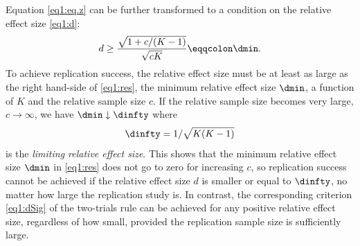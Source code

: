 Equation \eqref{eq1:eq.z} can be further transformed to a
condition on the relative effect size \eqref{eq1:d}:
\begin{equation}\label{eq1:res}
  d \geq  \frac{\sqrt{1+c/(K-1)}}{ \sqrt{c K}} \eqqcolon \dmin .
\end{equation}
To achieve replication success, the relative effect size must be at least as
large as the right hand-side of \eqref{eq1:res}, the minimum relative effect size
$\dmin$, a function of $K$ and the relative sample size $c$. If the relative
sample size becomes very large, \ie{} $c \rightarrow \infty$, we have
$\dmin \downarrow \dinfty$ where
\begin{equation}\label{eq1:smallestpossible}
  \dinfty = 1/\sqrt{K (K-1)}
\end{equation}
is the \textit{limiting relative effect size}. This shows that the minimum
relative effect size $\dmin$ in \eqref{eq1:res} does not go to zero for
increasing $c$, so replication success cannot be achieved if the relative effect
size $d$ is smaller or equal to $\dinfty$, no matter how large the replication
study is. In contrast, the corresponding criterion \eqref{eq1:dSig} of the
two-trials rule can be achieved for any positive relative effect size,
regardless of how small, provided the replication sample size is sufficiently
large.


